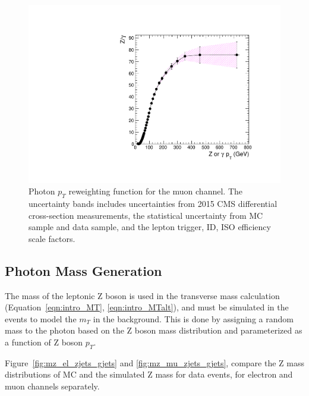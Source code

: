\begin{figure}[htbp]
\centering
  \includegraphics[width=0.9\linewidth]{figures/study_gjets_data_allcorV2_modify_mu.pdf}
  \caption{Photon $p_T$ reweighting function for the muon channel.
 The uncertainty bands includes uncertainties from 2015 CMS \Zjets differential cross-section measurements, the statistical uncertainty from \Zjets MC sample and \gjets data sample, and the lepton trigger, ID, ISO efficiency scale factors.}
  \label{fig:photon_pt_weight_mu}
\end{figure}

\subsection{Photon Mass Generation}\label{sec:gjetm}
The mass of the leptonic Z boson is used in the transverse mass calculation (Equation~\ref{eqn:intro_MT}, \ref{eqn:intro_MTalt}), and must be simulated in the \gjets events to model the $m_T$ in the \Zjets background. This is done by assigning a random mass to the photon based on the Z boson mass distribution and parameterized as a function of Z boson $p_T$.

\vspace{0.3cm}
Figure~\ref{fig:mz_el_zjets_gjets} and \ref{fig:mz_mu_zjets_gjets}, compare the Z mass distributions of \Zjets MC and the simulated Z mass for \gjets data events, for electron and muon channels separately.


